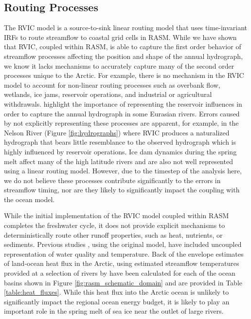 \documentclass[jgrga, draft]{agutex}
\begin{document}
\begin{article}
\subsection{Routing Processes}
The RVIC model is a source-to-sink linear routing model that uses time-invariant IRFs to route streamflow to coastal grid cells in RASM.
While we have shown that RVIC, coupled within RASM, is able to capture the first order behavior of streamflow processes affecting the position and shape of the annual hydrograph, we know it lacks mechanisms to accurately capture many of the second order processes unique to the Arctic.
For example, there is no mechanism in the RVIC model to account for non-linear routing processes such as overbank flow, wetlands, ice jams, reservoir operations, and industrial or agricultural withdrawals.
\citet{Adam_2007} highlight the importance of representing the reservoir influences in order to capture the annual hydrograph in some Eurasian rivers.
Errors caused by not explicitly representing these processes are apparent, for example, in the Nelson River (Figure \ref{fig:hydrographs}) where RVIC produces a naturalized hydrograph that bears little resemblance to the observed hydrograph which is highly influenced by reservoir operations.
Ice dam dynamics during the spring melt affect many of the high latitude rivers and are also not well represented using a linear routing model.
However, due to the timestep of the analysis here, we do not believe these processes contribute significantly to the errors in streamflow timing, nor are they likely to significantly impact the coupling with the ocean model.

While the initial implementation of the RVIC model coupled within RASM completes the freshwater cycle, it does not provide explicit mechanisms to deterministically route other runoff properties, such as heat, nutrients, or sediments.
Previous studies \citep[e.g.][]{vanVliet_2011,vanVliet_2012}, using the original \citet{Lohmann_1996} model, have included uncoupled representation of water quality and temperature.
Back of the envelope estimates of land-ocean heat flux in the Arctic, using estimated streamflow temperatures provided at a selection of rivers by \citet{Lammers_2007} have been calculated for each of the ocean basins shown in Figure \ref{fig:rasm_schematic_domain} and are provided in Table \ref{table:heat_fluxes}.
While this heat flux into the Arctic ocean is unlikely to significantly impact the regional ocean energy budget, it is likely to play an important role in the spring melt of sea ice near the outlet of large rivers.


\end{article}
\end{document}
